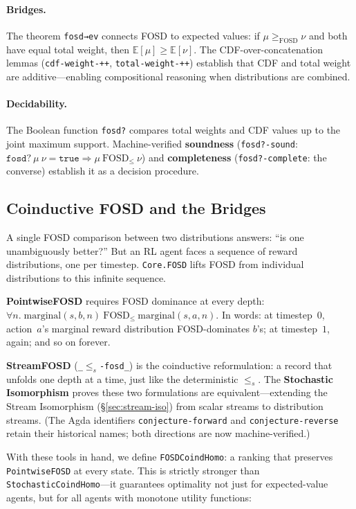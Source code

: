 \documentclass[9pt,a4paper]{article}
\theoremstyle{plain}
\theoremstyle{definition}
\theoremstyle{remark}
\begin{document}
\paragraph{Bridges.}
The theorem \texttt{fosd→ev} connects FOSD to expected values: if $\mu \ge_\text{FOSD} \nu$ and both have equal total weight, then $\mathbb{E}[\mu] \ge \mathbb{E}[\nu]$.  The CDF-over-concatenation lemmas (\texttt{cdf-weight-++}, \texttt{total-weight-++}) establish that CDF and total weight are additive---enabling compositional reasoning when distributions are combined.

\paragraph{Decidability.}
The Boolean function \texttt{fosd?} compares total weights and CDF values up to the joint maximum support.  Machine-verified \textbf{soundness} (\texttt{fosd?-sound}: $\texttt{fosd?}~\mu~\nu = \texttt{true} \Rightarrow \mu~\text{FOSD}_\le~\nu$) and \textbf{completeness} (\texttt{fosd?-complete}: the converse) establish it as a decision procedure.

\subsection{Coinductive FOSD and the Bridges}

A single FOSD comparison between two distributions answers: ``is one unambiguously better?''  But an RL agent faces a sequence of reward distributions, one per timestep.  \texttt{Core.FOSD} lifts FOSD from individual distributions to this infinite sequence.

\textbf{PointwiseFOSD} requires FOSD dominance at every depth: $\forall n.\;\text{marginal}(s,b,n)~\text{FOSD}_\le~\text{marginal}(s,a,n)$.  In words: at timestep~$0$, action~$a$'s marginal reward distribution FOSD-dominates $b$'s; at timestep~$1$, again; and so on forever.

\textbf{StreamFOSD} (\texttt{\_$\le_{s}$-fosd\_}) is the coinductive reformulation: a record that unfolds one depth at a time, just like the deterministic $\le_s$.  The \textbf{Stochastic Isomorphism} proves these two formulations are equivalent---extending the Stream Isomorphism (\S\ref{sec:stream-iso}) from scalar streams to distribution streams.  (The Agda identifiers \texttt{conjecture-forward} and \texttt{conjecture-reverse} retain their historical names; both directions are now machine-verified.)

With these tools in hand, we define \texttt{FOSDCoindHomo}: a ranking that preserves \texttt{PointwiseFOSD} at every state.  This is strictly stronger than \texttt{StochasticCoindHomo}---it guarantees optimality not just for expected-value agents, but for all agents with monotone utility functions:
\end{document}
